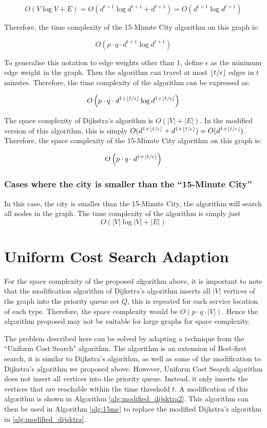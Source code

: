 $$O(V\log V+E)=O(d^{t+1}\log d^{t+1}+d^{t+1})=O(d^{t+1}\log d^{t+1})$$

Therefore, the time complexity of the 15-Minute City algorithm on this graph is:

$$O\left(p\cdot q\cdot d^{t+1}\log d^{t+1}\right)$$

To generalise this notation to edge weights other than 1, define $\epsilon$ as the minimum edge weight in the graph. Then the algorithm can travel at most $\floor*{t/\epsilon}$ edges in $t$ minutes. Therefore, the time complexity of the algorithm can be expressed as:

$$O\left(p\cdot q\cdot d^{1+\floor*{t/\epsilon}}\log d^{1+\floor*{t/\epsilon}}\right)$$

The space complexity of Dijkstra's algorithm is $O(|V|+|E|)$. In the modified version of this algorithm, this is simply $O(d^{1+\floor*{t/\epsilon}}+d^{1+\floor*{t/\epsilon}}) = O(d^{1+\floor*{t/\epsilon}})$. Therefore, the space complexity of the 15-Minute City algorithm on this graph is:

$$O\left(p\cdot q\cdot d^{1+\floor*{t/\epsilon}}\right)$$

\subsubsection{Cases where the city is smaller than the ``15-Minute City''}

In this case, the city is smaller than the 15-Minute City, the algorithm will search all nodes in the graph. The time complexity of the algorithm is simply just $$O(|V|\log |V|+|E|)$$

\section{Uniform Cost Search Adaption}

For the space complexity of the proposed algorithm above, it is important to note that the modification algorithm of Dijkstra's algorithm inserts all $|V|$ vertices of the graph into the priority queue set $Q$, this is repeated for each service location of each type. Therefore, the space complexity would be $O(p\cdot q\cdot |V|)$. Hence the algorithm proposed may not be suitable for large graphs for space complexity.

The problem described here can be solved by adapting a technique from the ``Uniform Cost Search" algorithm. The algorithm is an extension of Best-first search, it is similar to Dijkstra's algorithm, as well as some of the modification to Dijkstra's algorithm we proposed above. However, Uniform Cost Search algorithm does not insert all vertices into the priority queue. Instead, it only inserts the vertices that are reachable within the time threshold $t$. A modification of this algorithm is shown in Algorithm \ref{alg:modified_dijsktra2}. This algorithm can then be used in Algorithm \ref{alg:15mc} to replace the modified Dijkstra's algorithm in \ref{alg:modified_dijsktra}.

